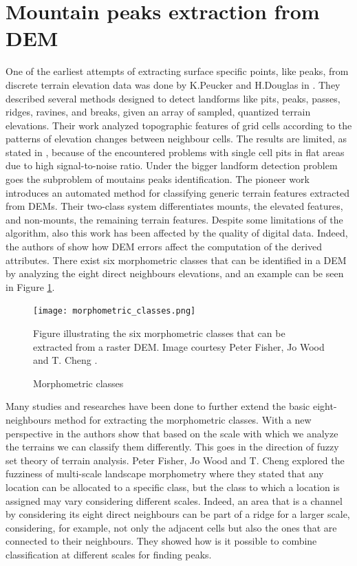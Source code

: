 \section{Mountain peaks extraction from DEM}\label{sec:mountain_peaks_from_dem}
One of the earliest attempts of extracting surface specific points, like peaks, from discrete terrain elevation data was done by K.Peucker and H.Douglas in  \cite{peackerAndDouglas}. They described several methods designed to detect landforms like pits, peaks, passes, ridges, ravines, and breaks, given an array of sampled, quantized terrain elevations. Their work analyzed topographic features of grid cells according to the patterns of elevation changes between neighbour cells.
The results are limited, as stated in \cite{lee1992modeling}, because of the encountered problems with single cell pits in flat areas due to high signal-to-noise
ratio.
Under the bigger landform detection problem goes the subproblem of moutains peaks identification. The pioneer work \cite{graff1993automated} introduces an automated method for classifying generic terrain features extracted from DEMs. Their two-class system differentiates mounts, the elevated features, and non-mounts, the remaining terrain features. Despite some limitations of the algorithm, also this work has been affected by the quality of digital data. Indeed, the authors of \cite{lee1992modeling} show how DEM errors affect the computation of the derived attributes. 
There exist six morphometric classes that can be identified in a DEM by analyzing the eight direct neighbours elevations, and an example can be seen in Figure \ref{fig:six_morphometric}.
\begin{figure} 
\centering
\texttt{[image: morphometric\_classes.png]}
\caption{Morphometric classes}
Figure illustrating the six morphometric classes that can be extracted from a raster DEM. Image courtesy Peter Fisher, Jo Wood and  T. Cheng \cite{fisher2004helvellyn}.
\label{fig:six_morphometric}
\end{figure}
Many studies and researches have been done to further extend the basic eight-neighbours method for extracting the morphometric classes. With a new perspective in \cite{fisherWhatIsAMountain} the authors show that based on the scale with which we analyze the terrains we can classify them differently. This goes in the direction of fuzzy set theory of terrain analysis. Peter Fisher, Jo Wood and  T. Cheng \cite{fisher2004helvellyn} explored the fuzziness of multi-scale landscape morphometry where they stated that any location can be allocated to a specific class, but the class to which a location is assigned may vary considering different scales. Indeed, an area that is a channel by considering its eight direct neighbours can be part of a ridge for a larger scale, considering, for example, not only the adjacent cells but also the ones that are connected to their neighbours. They showed how is it possible to combine classification at different scales for finding peaks.
